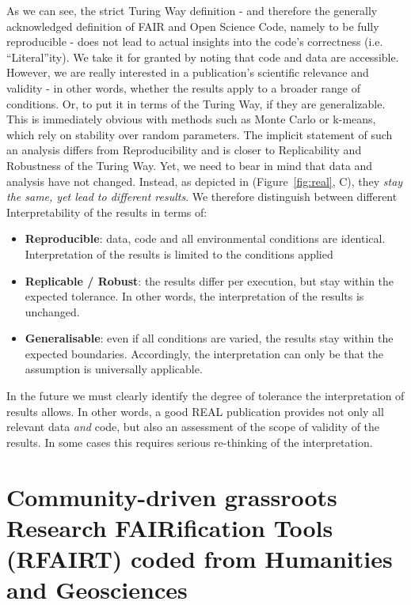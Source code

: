\documentclass{eceasst}
\begin{document}
As we can see, the strict Turing Way definition - and therefore the generally acknowledged definition of FAIR and Open Science Code, namely to be fully reproducible - does not lead to actual insights into the code's correctness (i.e. “Literal”ity). We take it for granted by noting that code and data are accessible. However, we are really interested in a publication's scientific relevance and validity - in other words, whether the results apply to a broader range of conditions. Or, to put it in terms of the Turing Way, if they are generalizable. This is immediately obvious with methods such as Monte Carlo or k-means, which rely on stability over random parameters. The implicit statement of such an analysis differs from Reproducibility and is closer to Replicability and Robustness of the Turing Way. Yet, we need to bear in mind that data and analysis have not changed. Instead, as depicted in (Figure~\ref{fig:real}, C), they \textit{stay the same, yet lead to different results}. We therefore distinguish between different Interpretability of the results in terms of:

\begin{itemize}
    \item \textbf{Reproducible}: data, code and all environmental conditions are identical. Interpretation of the results is limited to the conditions applied
    \item \textbf{Replicable / Robust}: the results differ per execution, but stay within the expected tolerance. In other words, the interpretation of the results is unchanged. 
    \item \textbf{Generalisable}: even if all conditions are varied, the results stay within the expected boundaries. Accordingly, the interpretation can only be that the assumption is universally applicable. 
\end{itemize}

In the future we must clearly identify the degree of tolerance the interpretation of results allows. In other words, a good REAL publication provides not only all relevant data \textit{and} code, but also an assessment of the scope of validity of the results. In some cases this requires serious re-thinking of the interpretation.

\section{Community-driven grassroots Research FAIRification Tools (RFAIRT) coded from Humanities and Geosciences}\label{Sec31}
\end{document}
